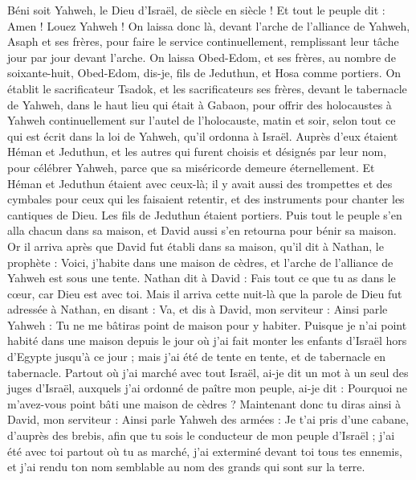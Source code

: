\begin{multicols}{2}
Béni soit Yahweh, le Dieu d'Israël, de siècle en siècle ! Et tout le peuple dit : Amen ! Louez Yahweh !
On laissa donc là, devant l'arche de l'alliance de Yahweh, Asaph et ses frères, pour faire le service continuellement, remplissant leur tâche jour par jour devant l'arche.
On laissa Obed-Edom, et ses frères, au nombre de soixante-huit, Obed-Edom, dis-je, fils de Jeduthun, et Hosa comme portiers.
On établit le sacrificateur Tsadok, et les sacrificateurs ses frères, devant le tabernacle de Yahweh, dans le haut lieu qui était à Gabaon,
pour offrir des holocaustes à Yahweh continuellement sur l'autel de l'holocauste, matin et soir, selon tout ce qui est écrit dans la loi de Yahweh, qu'il ordonna à Israël.
Auprès d'eux étaient Héman et Jeduthun, et les autres qui furent choisis et désignés par leur nom, pour célébrer Yahweh, parce que sa miséricorde demeure éternellement.
Et Héman et Jeduthun étaient avec ceux-là; il y avait aussi des trompettes et des cymbales pour ceux qui les faisaient retentir, et des instruments pour chanter les cantiques de Dieu. Les fils de Jeduthun étaient portiers.
Puis tout le peuple s'en alla chacun dans sa maison, et David aussi s'en retourna pour bénir sa maison.
\VerseOne{}Or il arriva après que David fut établi dans sa maison, qu'il dit à Nathan, le prophète : Voici, j'habite dans une maison de cèdres, et l'arche de l'alliance de Yahweh est sous une tente.
Nathan dit à David : Fais tout ce que tu as dans le cœur, car Dieu est avec toi.
Mais il arriva cette nuit-là que la parole de Dieu fut adressée à Nathan, en disant :
Va, et dis à David, mon serviteur : Ainsi parle Yahweh : Tu ne me bâtiras point de maison pour y habiter.
Puisque je n'ai point habité dans une maison depuis le jour où j'ai fait monter les enfants d'Israël hors d'Egypte jusqu'à ce jour ; mais j'ai été de tente en tente, et de tabernacle en tabernacle.
Partout où j'ai marché avec tout Israël, ai-je dit un mot à un seul des juges d'Israël, auxquels j'ai ordonné de paître mon peuple, ai-je dit : Pourquoi ne m'avez-vous point bâti une maison de cèdres ?
Maintenant donc tu diras ainsi à David, mon serviteur : Ainsi parle Yahweh des armées : Je t'ai pris d'une cabane, d'auprès des brebis, afin que tu sois le conducteur de mon peuple d'Israël ;
j'ai été avec toi partout où tu as marché, j'ai exterminé devant toi tous tes ennemis, et j'ai rendu ton nom semblable au nom des grands qui sont sur la terre.

\end{multicols}
